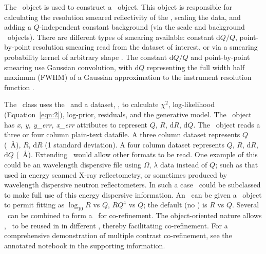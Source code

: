 \documentclass[pdf,preprint]{iucr}
\begin{document}
The \Structure\ object is used to construct a \ReflectModel\ object. This object is responsible for calculating the resolution smeared reflectivity of the \Structure, scaling the data, and adding a $Q$-independent constant background (via the scale and background \Parameter\ objects). There are different types of smearing available: constant $\mathrm{d}Q/Q$, point-by-point resolution smearing read from the dataset of interest, or via a smearing probability kernel of arbitrary shape \cite{Nelson2014}. The constant $\mathrm{d}Q/Q$ and point-by-point smearing use Gaussian convolution, with $\mathrm{d}Q$ representing the full width half maximum (FWHM) of a Gaussian approximation to the instrument resolution function \cite{Well2005}.

The \Objective\ class uses the \ReflectModel\ and a dataset, \DataD, to calculate $\chi^2$, log-likelihood (Equation~\ref{eqn:2}), log-prior, residuals, and the generative model.
The \DataD\ object has \emph{x, y, y\_err, x\_err} attributes to represent $Q$, $R$, $\mathrm{d}R$, $\mathrm{d}Q$. The \DataD\ object reads a three or four column plain-text datafile. A three column dataset represents $Q$ (\si{\per\angstrom}), $R$, $\mathrm{d}R$ (1 standard deviation). A four column dataset represents $Q$, $R$, $\mathrm{d}R$, $\mathrm{d}Q$ (\si{\per\angstrom}). Extending \DataD\ would allow other formats to be read. One example of this could be an wavelength dispersive file using $\Omega$, $\lambda$ data instead of $Q$; such as that used in energy scanned X-ray reflectometry, or sometimes produced by wavelength dispersive neutron reflectometers. In such a case \ReflectModel\ could be subclassed to make full use of this energy dispersive information.
An \Objective\ can be given a \Transform\ object to permit fitting as $\log_{10} R$ vs $Q$, $RQ^4$ vs $Q$; the default (no \Transform) is $R$ vs $Q$. Several \Objective\ can be combined to form a \GlobalObjective\ for co-refinement. The object-oriented nature allows \Parameter, \Component\ to be reused in in different \Objective, thereby facilitating co-refinement. For a comprehensive demonstration of multiple contrast co-refinement, see the annotated notebook in the supporting information.
\end{document}
